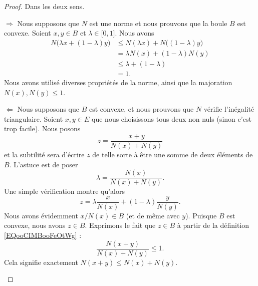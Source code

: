 \begin{proof}
	Dans les deux sens.
	\begin{subproof}
		\item[\( \Rightarrow\)]
		Nous supposons que \( N\) est une norme et nous prouvons que la boule \( B\) est convexe. Soient \( x,y\in B\) et \( \lambda\in \mathopen[ 0 , 1 \mathclose]\). Nous avons
		\begin{subequations}
			\begin{align}
				N\big( \lambda x+(1-\lambda)y \big) & \leq N(\lambda x)+N\big( (1-\lambda)y \big) \\
				                                    & = \lambda N(x)+(1-\lambda)N(y)              \\
				                                    & \leq \lambda +(1-\lambda)                   \\
				                                    & = 1.
			\end{align}
		\end{subequations}
		Nous avons utilisé diverses propriétés de la norme, ainsi que la majoration \( N(x), N(y)\leq 1\).
		\item[\( \Leftarrow\)]
		Nous supposons que \( B\) est convexe, et nous prouvons que \( N\) vérifie l'inégalité triangulaire. Soient \( x,y\in E\) que nous choisissons tous deux non nuls (sinon c'est trop facile). Nous posons
		\begin{equation}        \label{EQooCIMBooFeOtWg}
			z=\frac{ x+y }{ N(x)+N(y) }
		\end{equation}
		et la subtilité sera d'écrire \( z\) de telle sorte à être une somme de deux éléments de \( B\). L'astuce est de poser
		\begin{equation}
			\lambda=\frac{ N(x) }{ N(x)+N(y) }.
		\end{equation}
		Une simple vérification montre qu'alors
		\begin{equation}
			z = \lambda\frac{ x }{ N(x) }+  (1-\lambda) \frac{ y }{ N(y) }.
		\end{equation}
		Nous avons évidemment \( x/N(x)\in B\) (et de même avec \( y\)). Puisque \( B\) est convexe, nous avons \( z\in B\). Exprimons le fait que \( z\in B\) à partir de la définition \eqref{EQooCIMBooFeOtWg} :
		\begin{equation}
			\frac{ N(x+y) }{ N(x)+N(y) }\leq 1.
		\end{equation}
		Cela signifie exactement \( N(x+y)\leq N(x)+N(y)\).
	\end{subproof}
\end{proof}

